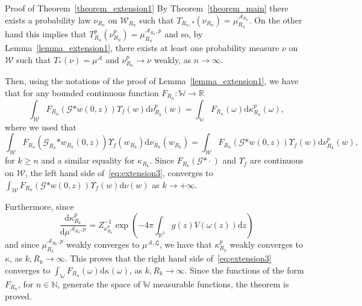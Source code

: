 \documentclass[a4paper,10pt]{article}
\newcommand{\asterisk}{\mathord{*}}
\newcommand{\mathd}{\mathrm{d}}
\newenvironment{proof*}[1]{\noindent\textbf{#1\ }}{\hspace*{\fill}$\Box$\medskip}
\begin{document}
\begin{proof*}{Proof of Theorem~\ref{theorem_extension1}}
  By Theorem~\ref{theorem_main} there exists a probability law $\nu_{R_n}$ on
  $\mathcal{W}_{R_n}$ such that $T_{R_n, \asterisk} (\nu_{R_n}) =
  \mu^{\mathcal{A}_{R_n}}_{R_n}$. On the other hand this implies that
  $T^p_{R_n} (\nu_{R_n}^p) = \mu^{\mathcal{A}_{R_n}, p}_{R_n}$ and so, by
  Lemma~\ref{lemma_extension1}, there exists at least one probability measure
  $\nu$ on $\mathcal{W}$ such that $T_{\asterisk} (\nu) = \mu^{\mathcal{A}}$
  and $\nu^p_{R_n} \rightarrow \nu$ weakly, as $n \rightarrow \infty$.
  
  Then, using the notations of the proof of Lemma~\ref{lemma_extension1}, we
  have that for any bounded continuous function $F_{R_n} : \mathbb{W}
  \rightarrow \mathbb{R}$
  \begin{equation}
    \int_{\mathcal{W}} F_{R_n} (\mathcal{G} \asterisk w (0, z)) \Upsilon_f (w)
    \mathd \nu^p_{R_k} (w) = \int_{\mathbb{W}} F_{R_n} (\omega) \mathd
    \kappa_{R_k}^p (\omega), \label{eq:extension3}
  \end{equation}
  where we used that
  \[ \int_{\mathcal{W}} F_{R_n} (\mathcal{G}_{R_k} \asterisk w_{R_k} (0, z))
     \Upsilon_f (w_{R_k}) \mathd \nu_{R_k} (w_{R_k}) = \int_{\mathcal{W}}
     F_{R_n} (\mathcal{G} \asterisk w (0, z)) \Upsilon_f (w) \mathd
     \nu^p_{R_k} (w), \]
  for $k \geqslant n$ and a similar equality for $\kappa_{R_k}$. Since
  $F_{R_k} (\mathcal{G} \asterisk \cdot)$ and $\Upsilon_f$ are continuous on
  $\mathcal{W}$, the left hand side of~{\eqref{eq:extension3}}, converges to
  $\int_{\mathcal{W}} F_{R_n} (\mathcal{G} \asterisk w (0, z)) \Upsilon_f (w)
  \mathd \nu (w)$ as $k \rightarrow + \infty$.
  
  Furthermore, since
  \[ \left. \frac{\mathd \kappa_{R_k}^p}{\mathd \mu^{\mathcal{A}_{R_k}, p}} =
     Z^{- 1}_{\kappa_{R_k}^p} \right. \left. \exp \left( - 4 \pi
     \int_{\mathbb{R}^2} g (z) V (\omega (z)) \mathd z \right) \right. \]
  and since $\mu^{\mathcal{A}_{R_k} \mathfrak{,} p}_{R_k}$ weakly converges to
  $\mu^{\mathcal{A}, \mathfrak{L}}$, we have that $\kappa^p_{R_k}$ weakly
  converges to $\kappa$, as $k, R_k \rightarrow \infty$. This proves that the
  right hand side of~{\eqref{eq:extension3}} converges to $\int_{\mathbb{W}}
  F_{R_n} (\omega) \mathd \kappa (\omega)$, as $k, R_k \rightarrow \infty$.
  Since the functions of the form $F_{R_n}$, for $n \in \mathbb{N}$, generate
  the space of $\mathbb{W}$ measurable functions, the theorem is proved.
\end{proof*}
\end{document}
